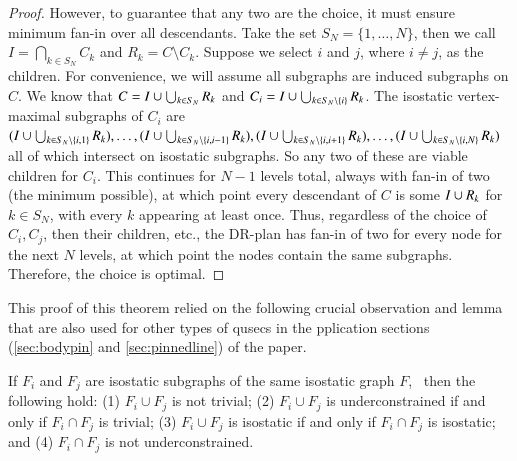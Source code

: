 \begin{proof}
However, to guarantee that any two are the  choice, it must ensure minimum fan-in over all descendants. Take the set $S_N=\{1,\dots,N\}$, then we call $I=\bigcap_{k\in S_N}{C_k}$ and $R_k=C\setminus C_k$. Suppose we select $i$ and $j$, where $i\neq j$, as the children. For convenience, we will assume all subgraphs are induced subgraphs on $C$. We know that $C=I\cup\bigcup_{k\in S_N}{R_k}$ and $C_i=I\cup\bigcup_{k\in S_N\setminus\{i\}}{R_k}$. The isostatic vertex-maximal subgraphs of $C_i$ are $(I\cup\bigcup_{k\in S_N\setminus\{i,1\}}{R_k}),\ldots,(I\cup\bigcup_{k\in S_N\setminus\{i,i-1\}}{R_k}),(I\cup\bigcup_{k\in S_N\setminus\{i,i+1\}}{R_k}),\ldots,(I\cup\bigcup_{k\in S_N\setminus\{i,N\}}{R_k})$ all of which intersect on isostatic subgraphs. So any two of these are viable children for $C_i$.
This continues for $N-1$ levels total, always with fan-in of two (the minimum possible), at which point every descendant of $C$ is some $I\cup R_k$ for $k\in S_N$, with every $k$ appearing at least once. Thus, regardless of the choice of $C_i,C_j$, then their children, etc., the DR-plan has fan-in of two for every node for the next $N$ levels, at which point the nodes contain the same subgraphs. Therefore, the choice is optimal.
%
%
\end{proof}

This proof of this theorem relied on the following crucial observation and lemma that are also used for other types of qusecs in the pplication sections (\ref{sec:bodypin} and \ref{sec:pinnedline}) of the paper.

\begin{observation*}\label{lemma:union_intersection}
If $F_i$ and $F_j$ are isostatic subgraphs of the same
isostatic graph $F$, \
then the following hold:
(1) $F_i\cup F_j$ is not trivial;
(2) $F_i\cup F_j$ is underconstrained if and only if $F_i\cap F_j$ is trivial;
(3) $F_i\cup F_j$ is isostatic if and only if $F_i\cap F_j$ is isostatic; and
(4) $F_i\cap F_j$ is not underconstrained.
\end{observation*}

